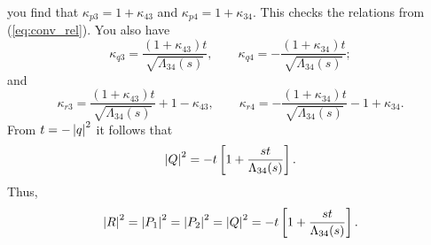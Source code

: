 you find that $\kappa_{p3} = 1 + \kappa_{43}$ and $\kappa_{p4} = 1 + \kappa_{34}$. This checks the relations from (\ref{eq:conv_rel}). You also have
\begin{equation}
	\kappa_{q3} = \frac{\left( 1 + \kappa_{43} \right) t}{\sqrt{\Lambda_{34}(s)}}, \qquad
	\kappa_{q4} = -\frac{\left( 1 + \kappa_{34} \right) t}{\sqrt{\Lambda_{34}(s)}};
\end{equation}
and
\begin{equation}
	\kappa_{r3} = \frac{\left( 1 + \kappa_{43} \right) t}{\sqrt{\Lambda_{34}(s)}} + 1 - \kappa_{43}, \qquad 
	\kappa_{r4} = - \frac{\left( 1 + \kappa_{34} \right) t}{\sqrt{\Lambda_{34}(s)}} - 1 + \kappa_{34}.
\end{equation}
From $t = -\left\lvert q \right\rvert^{2}$ it follows that
\begin{equation}
	\left\lvert Q \right\rvert^{2} = -t \left[ 1 + \frac{s t}{\Lambda_{34}(s)} \right].
\end{equation}
Thus,
\begin{equation}
	\left\lvert R \right\rvert^{2} = \left\lvert P_{1} \right\rvert^{2} = \left\lvert P_{2} \right\rvert^{2} = \left\lvert Q \right\rvert^{2} = -t \left[ 1 + \frac{s t}{\Lambda_{34}(s)} \right].
\end{equation}